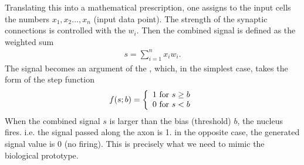 \documentclass[letterpaper,10pt,english]{jupyterBook}
\begin{document}
\sphinxAtStartPar
Translating this into a mathematical prescription, one assigns to the input cells the numbers \(x_1, x_2 \dots, x_n\) (input data point). The strength of the synaptic connections is controlled with the  \(w_i\). Then the combined signal is defined as the weighted sum
\begin{equation*}
\begin{split}s=\sum_{i=1}^n x_i w_i.\end{split}
\end{equation*}
\sphinxAtStartPar
The signal becomes an argument of the , which, in the simplest case, takes the form of the step function
\begin{equation*}
\begin{split}
f(s;b) = \left \{ \begin{array}{l} 1 {\rm ~for~} s \ge b \\ 0 {\rm ~for~} s < b \end{array} \right .
\end{split}
\end{equation*}
\sphinxAtStartPar
When the combined signal \(s\) is larger than the bias (threshold) \(b\), the nucleus fires. i.e. the signal passed along the axon is 1. in the opposite case, the generated signal value is 0 (no firing). This is precisely what we need to mimic the biological prototype.
\end{document}
